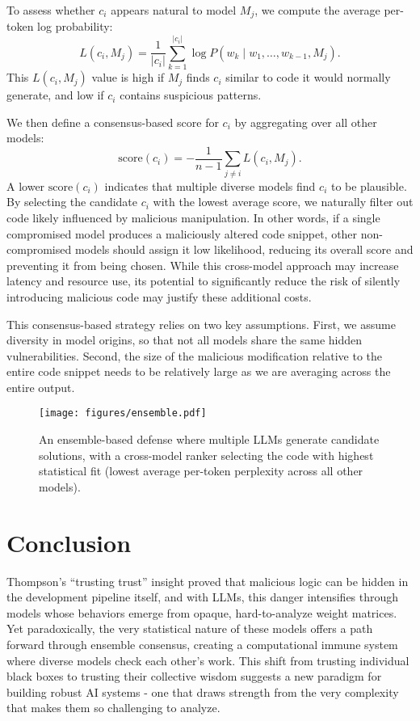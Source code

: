 \documentclass[12pt]{article}
\begin{document}
To assess whether $c_i$ appears natural to model $M_j$, we compute the average per-token log probability:
\[
L(c_i,M_j) = \frac{1}{|c_i|}\sum_{k=1}^{|c_i|} \log P(w_k \mid w_1,\dots,w_{k-1},M_j).
\]
This $L(c_i,M_j)$ value is high if $M_j$ finds $c_i$ similar to code it would normally generate, and low if $c_i$ contains suspicious patterns.

We then define a consensus-based score for $c_i$ by aggregating over all other models:
\[
\text{score}(c_i) = -\frac{1}{n-1}\sum_{j \neq i} L(c_i,M_j).
\]
A lower \(\text{score}(c_i)\) indicates that multiple diverse models find $c_i$ to be plausible. By selecting the candidate $c_i$ with the lowest average score, we naturally filter out code likely influenced by malicious manipulation. In other words, if a single compromised model produces a maliciously altered code snippet, other non-compromised models should assign it low likelihood, reducing its overall score and preventing it from being chosen. While this cross-model approach may increase latency and resource use, its potential to significantly reduce the risk of silently introducing malicious code may justify these additional costs.

This consensus-based strategy relies on two key assumptions. First, we assume diversity in model origins, so that not all models share the same hidden vulnerabilities. Second, the size of the malicious modification relative to the entire code snippet needs to be relatively large as we are averaging across the entire output.

\begin{figure}[t]
    \centering
    \texttt{[image: figures/ensemble.pdf]}
    \caption{An ensemble-based defense where multiple LLMs generate candidate solutions, with a cross-model ranker selecting the code with highest statistical fit (lowest average per-token perplexity across all other models).}
    \label{fig:llm_ensemble_analogy}
\end{figure}


\section{Conclusion}

Thompson's ``trusting trust'' insight proved that malicious logic can be hidden in the development pipeline itself, and with LLMs, this danger intensifies through models whose behaviors emerge from opaque, hard-to-analyze weight matrices. Yet paradoxically, the very statistical nature of these models offers a path forward through ensemble consensus, creating a computational immune system where diverse models check each other's work. This shift from trusting individual black boxes to trusting their collective wisdom suggests a new paradigm for building robust AI systems - one that draws strength from the very complexity that makes them so challenging to analyze.


\end{document}
